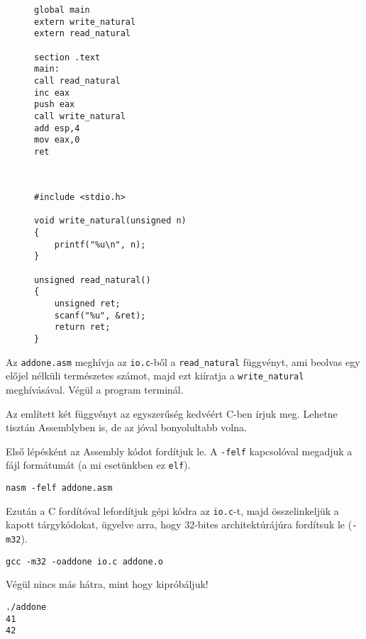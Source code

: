 \begin{figure}[h]
\begin{minipage}{0.45\linewidth}
	\begin{lstlisting}[style=asmstyle, caption={\texttt{addone.asm}}]
global main
extern write_natural
extern read_natural

section .text
main:
call read_natural
inc eax
push eax
call write_natural
add esp,4
mov eax,0
ret
	\end{lstlisting}
\end{minipage}
\begin{minipage}{0.05\linewidth}
	~
\end{minipage}
\begin{minipage}{0.45\linewidth}
	\begin{lstlisting}[style=cppstyle, caption={\texttt{io.c}}]
#include <stdio.h>

void write_natural(unsigned n) 
{
	printf("%u\n", n);
}

unsigned read_natural() 
{
	unsigned ret;
	scanf("%u", &ret);
	return ret;
}
	\end{lstlisting}
\end{minipage}
\end{figure}

Az \texttt{addone.asm} meghívja az \texttt{io.c}-ből a \texttt{read\_natural} függvényt, ami beolvas egy előjel nélküli természetes számot, majd ezt kiíratja a \texttt{write\_natural} meghívásával. Végül a program terminál.

Az említett két függvényt az egyszerűség kedvéért C-ben írjuk meg.
Lehetne tisztán Assemblyben is, de az jóval bonyolultabb volna.

Első lépésként az Assembly kódot fordítjuk le. A \texttt{-felf} kapcsolóval megadjuk a fájl formátumát (a mi esetünkben ez \texttt{elf}).

\begin{lstlisting}[style=machinestyle]
nasm -felf addone.asm
\end{lstlisting}

Ezután a C fordítóval lefordítjuk gépi kódra az \texttt{io.c}-t, majd összelinkeljük a kapott tárgykódokat, ügyelve arra, hogy 32-bites architektúrájúra fordítsuk le (\texttt{-m32}).

\begin{lstlisting}[style=machinestyle]
gcc -m32 -oaddone io.c addone.o
\end{lstlisting}

Végül nincs más hátra, mint hogy kipróbáljuk!

\begin{lstlisting}[style=machinestyle]
./addone
41
42
\end{lstlisting}